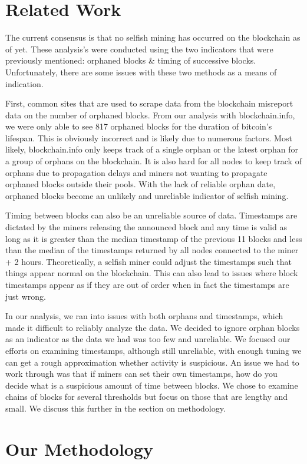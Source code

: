 \documentclass{sig-alternate-05-2015}
\begin{document}
\section{Related Work}
The current consensus is that no selfish mining has occurred on the blockchain as of yet. These analysis's were conducted using the two indicators that were previously mentioned: orphaned blocks \& timing of successive blocks. Unfortunately, there are some issues with these two methods as a means of indication. 

First, common sites that are used to scrape data from the blockchain misreport data on the number of orphaned blocks. From our analysis with blockchain.info, we were only able to see 817 orphaned blocks for the duration of bitcoin's lifespan. This is obviously incorrect and is likely due to numerous factors. Most likely, blockchain.info only keeps track of a single orphan or the latest orphan for a group of orphans on the blockchain. It is also hard for all nodes to keep track of orphans due to propagation delays and miners not wanting to propagate orphaned blocks outside their pools. With the lack of reliable orphan date, orphaned blocks become an unlikely and unreliable indicator of selfish mining.

Timing between blocks can also be an unreliable source of data. Timestamps are dictated by the miners releasing the announced block and any time is valid as long as it is greater than the median timestamp of the previous 11 blocks and less than the median of the timestamps returned by all nodes connected to the miner + 2 hours. Theoretically, a selfish miner could adjust the timestamps such that things appear normal on the blockchain. This can also lead to issues where block timestamps appear as if they are out of order when in fact the timestamps are just wrong. 

In our analysis, we ran into issues with both orphans and timestamps, which made it difficult to reliably analyze the data. We decided to ignore orphan blocks as an indicator as the data we had was too few and unreliable. We focused our efforts on examining timestamps, although still unreliable, with enough tuning we can get a rough approximation whether activity is suspicious. An issue we had to work through was that if miners can set their own timestamps, how do you decide what is a suspicious amount of time between blocks. We chose to examine chains of blocks for several thresholds but focus on those that are lengthy and small. We discuss this further in the section on methodology.
\section{Our Methodology}
\end{document}
